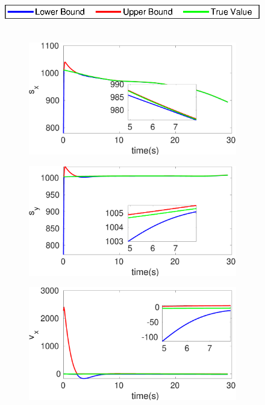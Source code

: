 \begin{figure}[h]
\hspace*{\fill} \includegraphics[scale=0.8]{figures/legend}\\\\
\begin{subfigure}{.5\linewidth}
\centering
\includegraphics[width=\linewidth]{figures/Prad/s3pmprads_x}
\end{subfigure}
\begin{subfigure}{.5\linewidth}
\centering
\includegraphics[width=\linewidth]{figures/Prad/s3pmprads_y}
\end{subfigure}
\begin{subfigure}{.5\linewidth}
\centering
\includegraphics[width=\linewidth]{figures/Prad/s3pmpradv_x}

\end{subfigure}
\end{figure}
